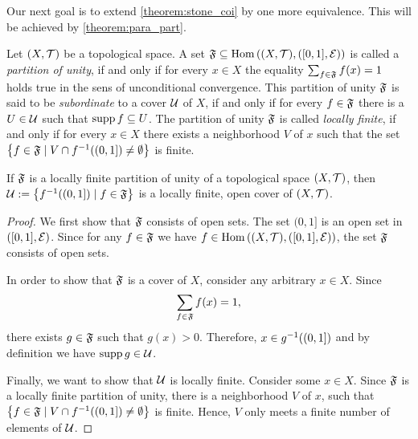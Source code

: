 Our next goal is to extend \ref{theorem:stone_coi} by one more equivalence. This will be achieved by \ref{theorem:para_part}.

\begin{definition}
	Let $\tspace$ be a topological space. A set $\partition \subseteq \Hom\pbraces{\tspace, \eucl}$ is called a \textit{partition of unity}, if and only if for every $x \in X$ the equality $\sum_{f \in \mathfrak{F}} f(x) = 1$ holds true in the sens of unconditional convergence. This partition of unity $\mathfrak{F}$ is said to be \textit{subordinate} to a cover $\mathcal{U}$ of $X$, if and only if for every $f \in \mathfrak{F}$ there is a $U \in \mathcal{U}$ such that $\operatorname{supp} f \subseteq U$. The partition of unity $\mathfrak{F}$ is called \textit{locally finite}, if and only if for every $x \in X$ there exists a neighborhood $V$ of $x$ such that the set ${\left \{ f \in \mathfrak{F} \mid V \cap f^{-1}{\left ( (0, 1] \right )} \neq \emptyset \right \}}$ is finite.
\end{definition}

\begin{lemma}\label{lemma:part_to_para}
	If $\mathfrak{F}$ is a locally finite partition of unity of a topological space $\tspace$, then $\mathcal{U} := {\left \{ f^{-1}{\left ( (0,1] \right )} \mid f \in \mathfrak{F} \right \}}$ is a locally finite, open cover of $\tspace$. 
\end{lemma}
\begin{proof}
	We first show that $\mathfrak{F}$ consists of open sets. The set $(0,1]$ is an open set in ${\left ( {\left [ 0,1 \right ]}, \mathcal{E} \right )}$. Since for any $f \in \mathfrak{F}$ we have $f \in \Hom\pbraces{\tspace, \eucl}$, the set $\mathfrak{F}$ consists of open sets. 
	
	In order to show that $\mathfrak{F}$ is a cover of $X$, consider any arbitrary $x \in X$. Since 
	\begin{align*}
	\sum_{f \in \mathfrak{F}} f(x) = 1,
	\end{align*}
	there exists $g \in \mathfrak{F}$ such that $g(x) > 0$. Therefore, $x \in g^{-1}{\left ( (0,1] \right )}$ and by definition we have $\operatorname{supp} g \in \mathcal{U}$. 
	
	Finally, we want to show that $\mathcal{U}$ is locally finite. Consider some $x \in X$. Since $\mathfrak{F}$ is a locally finite partition of unity, there is a neighborhood $V$ of $x$, such that ${\left \{ f \in \mathfrak{F} \mid V \cap f^{-1}{\left ( (0,1] \right )} \neq \emptyset \right \}}$ is finite. Hence, $V$ only meets a finite number of elements of $\mathcal{U}$. 
\end{proof}

